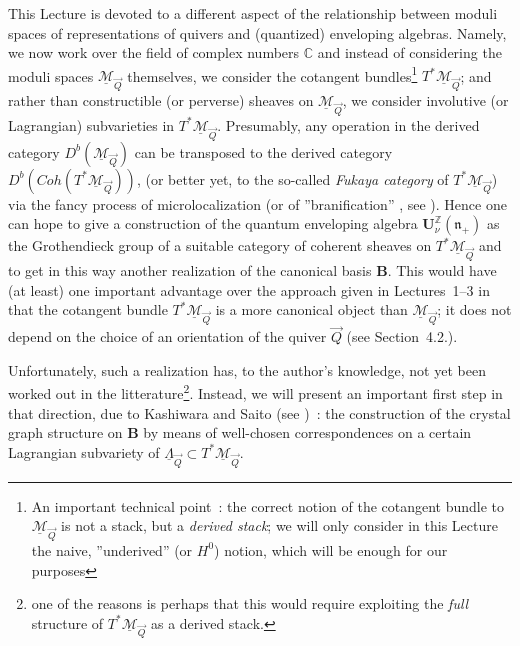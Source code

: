 \documentclass[a4paper,10pt]{amsart}
\def\Z{\mathbb{Z}}
\def\U{\mathbf{U}}
\def\C{\mathbb{C}}
\def\n{\mathfrak{n}}
\numberwithin{equation}{section}
\begin{document}
This Lecture is devoted to a different aspect of the relationship between moduli spaces of representations of quivers and (quantized) enveloping algebras. Namely, we now work over the field of complex numbers $\C$ and instead of considering the moduli spaces $\underline{\mathcal{M}}_{\vec{Q}}$ themselves, we consider the cotangent bundles\footnote{An important technical point~: the correct notion of the cotangent bundle to $\underline{\mathcal{M}}_{\vec{Q}}$ is not a stack, but a \textit{derived stack}; we will only consider in this Lecture the naive, ''underived'' (or $H^0$) notion, which will be enough for our purposes} $T^* \underline{\mathcal{M}}_{\vec{Q}}$; and rather than constructible (or perverse) sheaves on $\underline{\mathcal{M}}_{\vec{Q}}$, we consider involutive (or Lagrangian) subvarieties in $T^* \underline{\mathcal{M}}_{\vec{Q}}$. Presumably, any operation in the derived category $D^b(\underline{\mathcal{M}}_{\vec{Q}})$ can be transposed to the derived category $D^b(Coh(T^*\underline{\mathcal{M}}_{\vec{Q}}))$, (or better yet,  to the so-called \textit{Fukaya category} of $T^*\underline{\mathcal{M}}_{\vec{Q}}$) via the fancy process of microlocalization (or of ''branification'' , see \cite{Nadler}). Hence one can hope to give a construction of the quantum enveloping algebra $\U_{\nu}^{\Z}(\n_+)$ as the Grothendieck group of a suitable category of coherent sheaves on $T^*\underline{\mathcal{M}}_{\vec{Q}}$ and to get in this way another realization of the canonical basis $\mathbf{B}$. This would have (at least) one important advantage over the approach given in Lectures~1--3 in that the cotangent bundle $T^* \underline{\mathcal{M}}_{\vec{Q}}$ is a more canonical object than $\underline{\mathcal{M}}_{\vec{Q}}$; it does not depend on the choice of an orientation of the quiver $\vec{Q}$ (see Section~4.2.).

\vspace{.1in}

Unfortunately, such a realization has, to the author's knowledge, not yet been worked out in the litterature\footnote{one of the reasons is perhaps that this would require exploiting the \textit{full} structure of $T^*\underline{\mathcal{M}}_{\vec{Q}}$ as a derived stack.}. Instead, we will present an important first step in that direction, due to Kashiwara and Saito (see \cite{KS})~: the construction of the crystal graph structure on $\mathbf{B}$ by means of well-chosen correspondences on a certain Lagrangian subvariety of $\underline{\Lambda}_{\vec{Q}} \subset T^*\underline{\mathcal{M}}_{\vec{Q}}$.
\end{document}
